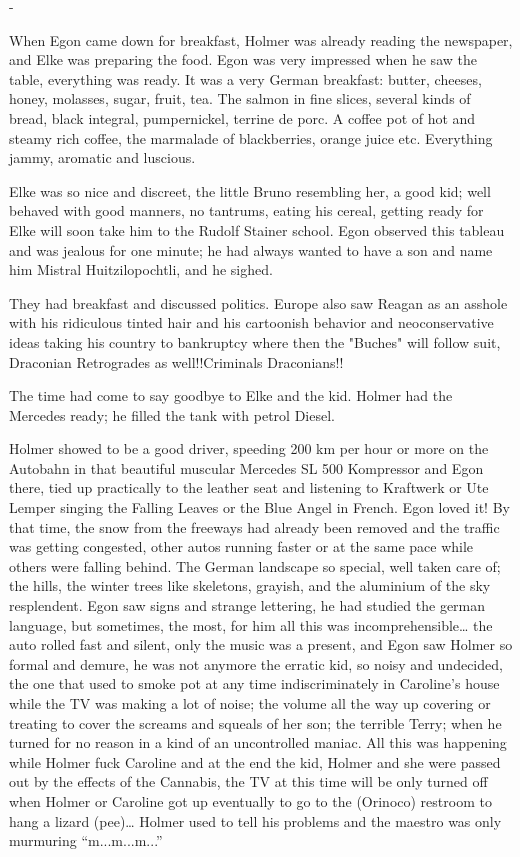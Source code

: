 \documentclass[smalldemyvopaper,11pt,twoside,onecolumn,openright,extrafontsizes]{memoir}
\begin{document}
-

When Egon came down for breakfast, Holmer was already reading the newspaper, and Elke was preparing the food. Egon was very impressed when he saw the table, everything was ready. It was a very German breakfast: butter, cheeses, honey, molasses, sugar, fruit, tea. The salmon in fine slices, several kinds of bread, black integral, pumpernickel, terrine de porc. A coffee pot of hot and steamy rich coffee, the marmalade of blackberries, orange juice etc. Everything jammy, aromatic and luscious.

Elke was so nice and discreet, the little Bruno resembling her, a good kid; well behaved with good manners, no tantrums, eating his cereal, getting ready for Elke will soon take him to the Rudolf Stainer school. Egon observed this tableau and was jealous for one minute; he had always wanted to have a son and name him Mistral Huitzilopochtli, and he sighed.

They had breakfast and discussed politics. Europe also saw Reagan as an asshole with his ridiculous tinted hair and his cartoonish behavior and neoconservative ideas taking his country to bankruptcy where then the "Buches" will follow suit, Draconian Retrogrades as well!!Criminals Draconians!!

The time had come to say goodbye to Elke and the kid. Holmer had the Mercedes ready; he filled the tank with petrol Diesel.

Holmer showed to be a good driver, speeding 200 km per hour or more on the Autobahn in that beautiful muscular Mercedes SL 500 Kompressor and Egon there, tied up practically to the leather seat and listening to Kraftwerk or Ute Lemper singing the Falling Leaves or the Blue Angel in French. Egon loved it! By that time, the snow from the freeways had already been removed and the traffic was getting congested, other autos running faster or at the same pace while others were falling behind. The German landscape so special, well taken care of; the hills, the winter trees like skeletons, grayish, and the aluminium of the sky resplendent. Egon saw signs and strange lettering, he had studied the german language, but sometimes, the most, for him all this was incomprehensible… the auto rolled fast and silent, only the music was a present, and Egon saw Holmer so formal and demure, he was not anymore the erratic kid, so noisy and undecided, the one that used to smoke pot at any time indiscriminately in Caroline’s house while the TV was making a lot of noise; the volume all the way up covering or treating to cover the screams and squeals of her son; the terrible Terry; when he turned for no reason in a kind of an uncontrolled maniac. All this was happening while Holmer fuck Caroline and at the end the kid, Holmer and she were passed out by the effects of the Cannabis, the TV at this time will be only turned off when Holmer or Caroline got up eventually to go to the (Orinoco) restroom to hang a lizard (pee)… Holmer used to tell his problems and the maestro was only murmuring “m...m...m...”
\end{document}
